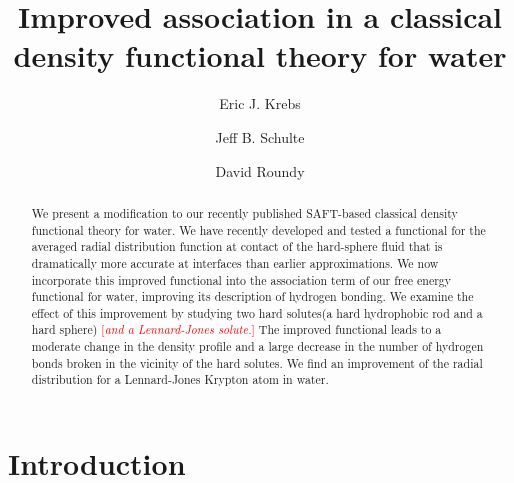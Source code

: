 \documentclass[preprint,amsmath,amssymb]{revtex4-1}
\newcommand{\fixme}[1]{\textcolor{red}{[\emph{#1}]}}
\begin{document}
\title{Improved association in a classical density functional theory
  for water}

\author{Eric J. Krebs}
\author{Jeff B. Schulte}
\author{David Roundy}

\begin{abstract}
We present a modification to our recently published SAFT-based classical
density functional theory for water.
%
We have recently developed and tested a functional for the averaged
radial distribution function at contact of the hard-sphere fluid
that is dramatically more accurate at interfaces than earlier
approximations.
%
We now incorporate this improved functional into the association term
of our free energy functional for water, improving its description of
hydrogen bonding.
%
We examine the effect of this improvement by studying two hard solutes(a
hard hydrophobic rod and a hard sphere) \fixme{and a Lennard-Jones solute.}
%
The improved functional leads to a moderate change in the density
profile and a large decrease in the number of hydrogen bonds broken in
the vicinity of the hard solutes.  
%
We find an improvement of the radial distribution for a Lennard-Jones
Krypton atom in water.
\end{abstract}
\maketitle

\section{Introduction}
\end{document}

